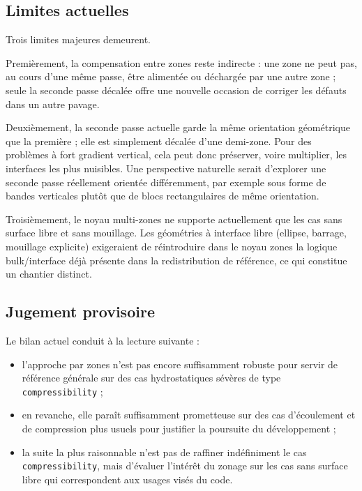 \documentclass[11pt,a4paper]{article}
\begin{document}
\subsection{Limites actuelles}

Trois limites majeures demeurent.

Premièrement, la compensation entre zones reste indirecte : une zone ne peut pas, au cours d'une même passe, être alimentée ou déchargée par une autre zone ; seule la seconde passe décalée offre une nouvelle occasion de corriger les défauts dans un autre pavage.

Deuxièmement, la seconde passe actuelle garde la même orientation géométrique que la première ; elle est simplement décalée d'une demi-zone. Pour des problèmes à fort gradient vertical, cela peut donc préserver, voire multiplier, les interfaces les plus nuisibles. Une perspective naturelle serait d'explorer une seconde passe réellement orientée différemment, par exemple sous forme de bandes verticales plutôt que de blocs rectangulaires de même orientation.

Troisièmement, le noyau multi-zones ne supporte actuellement que les cas sans surface libre et sans mouillage. Les géométries à interface libre (ellipse, barrage, mouillage explicite) exigeraient de réintroduire dans le noyau zones la logique bulk/interface déjà présente dans la redistribution de référence, ce qui constitue un chantier distinct.

\subsection{Jugement provisoire}

Le bilan actuel conduit à la lecture suivante :
\begin{itemize}
  \item l'approche par zones n'est pas encore suffisamment robuste pour servir de référence générale sur des cas hydrostatiques sévères de type \texttt{compressibility} ;
  \item en revanche, elle paraît suffisamment prometteuse sur des cas d'écoulement et de compression plus usuels pour justifier la poursuite du développement ;
  \item la suite la plus raisonnable n'est pas de raffiner indéfiniment le cas \texttt{compressibility}, mais d'évaluer l'intérêt du zonage sur les cas sans surface libre qui correspondent aux usages visés du code.
\end{itemize}
\end{document}
